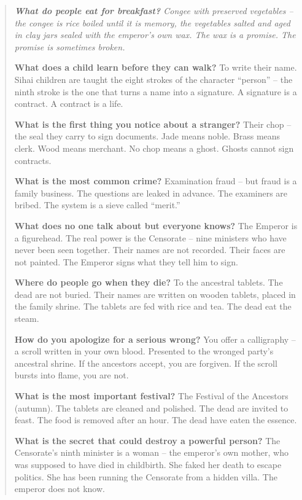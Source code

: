 \documentclass[12pt,oneside]{book}
\newenvironment{almanac}
  {\begin{quote}\small\itshape}
  {\end{quote}}
\begin{document}
\vspace{1em}
\begin{almanac}
\textbf{What do people eat for breakfast?} Congee with preserved vegetables -- the congee is rice boiled until it is memory, the vegetables salted and aged in clay jars sealed with the emperor's own wax. The wax is a promise. The promise is sometimes broken.

\textbf{What does a child learn before they can walk?} To write their name. Sihai children are taught the eight strokes of the character ``person'' -- the ninth stroke is the one that turns a name into a signature. A signature is a contract. A contract is a life.

\textbf{What is the first thing you notice about a stranger?} Their chop -- the seal they carry to sign documents. Jade means noble. Brass means clerk. Wood means merchant. No chop means a ghost. Ghosts cannot sign contracts.

\textbf{What is the most common crime?} Examination fraud -- but fraud is a family business. The questions are leaked in advance. The examiners are bribed. The system is a sieve called ``merit.''

\textbf{What does no one talk about but everyone knows?} The Emperor is a figurehead. The real power is the Censorate -- nine ministers who have never been seen together. Their names are not recorded. Their faces are not painted. The Emperor signs what they tell him to sign.

\textbf{Where do people go when they die?} To the ancestral tablets. The dead are not buried. Their names are written on wooden tablets, placed in the family shrine. The tablets are fed with rice and tea. The dead eat the steam.

\textbf{How do you apologize for a serious wrong?} You offer a calligraphy -- a scroll written in your own blood. Presented to the wronged party's ancestral shrine. If the ancestors accept, you are forgiven. If the scroll bursts into flame, you are not.

\textbf{What is the most important festival?} The Festival of the Ancestors (autumn). The tablets are cleaned and polished. The dead are invited to feast. The food is removed after an hour. The dead have eaten the essence.

\textbf{What is the secret that could destroy a powerful person?} The Censorate's ninth minister is a woman -- the emperor's own mother, who was supposed to have died in childbirth. She faked her death to escape politics. She has been running the Censorate from a hidden villa. The emperor does not know.
\end{almanac}
\end{document}
